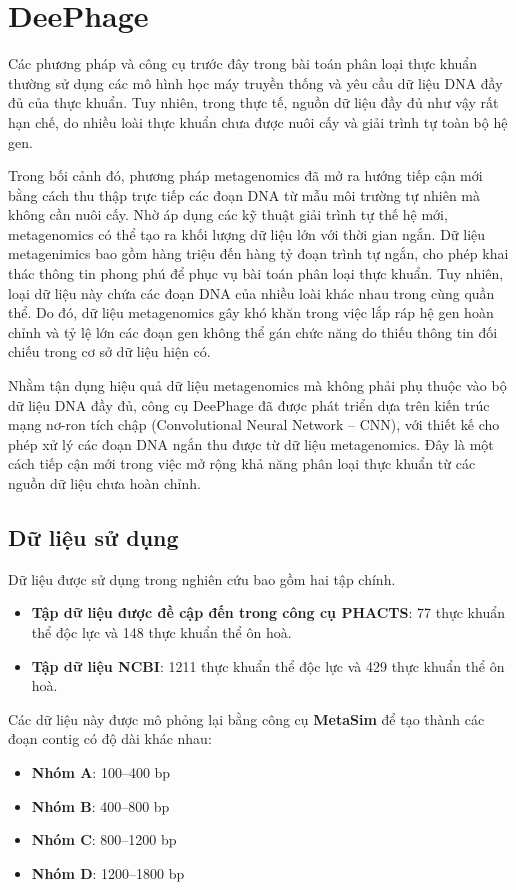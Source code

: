 \section{DeePhage}

Các phương pháp và công cụ trước đây trong bài toán phân loại thực khuẩn thường sử dụng các mô hình học máy truyền thống và yêu cầu dữ liệu DNA đầy đủ của thực khuẩn. Tuy nhiên, trong thực tế, nguồn dữ liệu đầy đủ như vậy rất hạn chế, do nhiều loài thực khuẩn chưa được nuôi cấy và giải trình tự toàn bộ hệ gen.

Trong bối cảnh đó, phương pháp metagenomics đã mở ra hướng tiếp cận mới bằng cách thu thập trực tiếp các đoạn DNA từ mẫu môi trường tự nhiên mà không cần nuôi cấy. Nhờ áp dụng các kỹ thuật giải trình tự thế hệ mới, metagenomics có thể tạo ra khối lượng dữ liệu lớn với thời gian ngắn. Dữ liệu metagenimics bao gồm hàng triệu đến hàng tỷ đoạn trình tự ngắn, cho phép khai thác thông tin phong phú để phục vụ bài toán phân loại thực khuẩn. Tuy nhiên, loại dữ liệu này chứa các đoạn DNA của nhiều loài khác nhau trong cùng quần thể. Do đó, dữ liệu metagenomics gây khó khăn trong việc lắp ráp hệ gen hoàn chỉnh và tỷ lệ lớn các đoạn gen không thể gán chức năng do thiếu thông tin đối chiếu trong cơ sở dữ liệu hiện có.

Nhằm tận dụng hiệu quả dữ liệu metagenomics mà không phải phụ thuộc vào bộ dữ liệu DNA đầy đủ, công cụ DeePhage \cite{wu2021deephage} đã được phát triển dựa trên kiến trúc mạng nơ-ron tích chập (Convolutional Neural Network – CNN), với thiết kế cho phép xử lý các đoạn DNA ngắn thu được từ dữ liệu metagenomics. Đây là một cách tiếp cận mới trong việc mở rộng khả năng phân loại thực khuẩn từ các nguồn dữ liệu chưa hoàn chỉnh.

\subsection*{Dữ liệu sử dụng}

Dữ liệu được sử dụng trong nghiên cứu bao gồm hai tập chính.
\begin{itemize}
    \item \textbf{Tập dữ liệu được đề cập đến trong công cụ PHACTS}: 77 thực khuẩn thể độc lực và 148 thực khuẩn thể ôn hoà.
    \item \textbf{Tập dữ liệu NCBI}: 1211 thực khuẩn thể độc lực và 429 thực khuẩn thể ôn hoà.
\end{itemize}
    
Các dữ liệu này được mô phỏng lại bằng công cụ \textbf{MetaSim} để tạo thành các đoạn contig có độ dài khác nhau:
\begin{itemize}
    \item \textbf{Nhóm A}: 100–400 bp
    \item \textbf{Nhóm B}: 400–800 bp
    \item \textbf{Nhóm C}: 800–1200 bp
    \item \textbf{Nhóm D}: 1200–1800 bp
\end{itemize}


